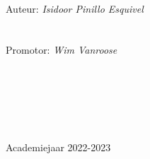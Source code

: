 \begin{titlepage}
\begin{center}
        \ \\
        \normalsize
        Auteur: {\em Isidoor Pinillo Esquivel}\\
        \ \\
        \ \\
        Promotor: {\em Wim Vanroose}\\
        \ \\
        \ \\
        \ \\
        \ \\
        \ \\
        \ \\
        A{\sc cademiejaar 2022-2023}

    \end{center}
\end{titlepage}


